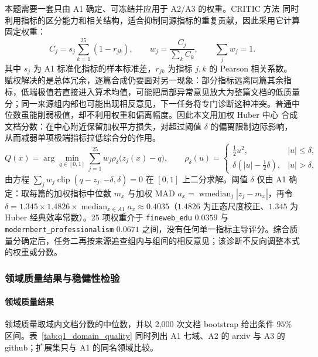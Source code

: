 本题需要一套只由 A1 确定、可冻结并应用于 A2/A3 的权重。CRITIC 方法\cite{critic} 同时利用指标的区分能力和相关结构，适合抑制同源指标的重复贡献，因此采用它计算固定权重：
\begin{equation}
\label{eq:q1_critic}
C_j=s_j\sum_{k=1}^{25}(1-r_{jk}),\qquad w_j=\frac{C_j}{\sum_k C_k},\qquad \sum_j w_j=1 .
\end{equation}
其中 $s_j$ 为 A1 标准化指标的样本标准差，$r_{jk}$ 为指标 $j,k$ 的 Pearson 相关系数。赋权解决的是总体冗余，逐篇合成仍要面对另一现象：部分指标远离同篇其余指标，低端极值若直接进入算术均值，可能把局部异常意见放大为整篇文档的低质量分；同一来源组内部也可能出现相反意见，下一任务将专门诊断这种冲突。普通中位数虽能削弱极值，却不利用权重和偏离幅度。因此本文用加权 Huber 中心\cite{huber} 合成文档分数：在中心附近保留加权平方损失，对超过阈值 $\delta$ 的偏离限制边际影响，从而减弱单项极端指标拉低综合分的作用。
\begin{equation}
\label{eq:q1_huber}
Q(x)=\arg\min_{q\in[0,1]}\sum_{j=1}^{25}w_j\rho_\delta\bigl(z_j(x)-q\bigr),\qquad
\rho_\delta(u)=\begin{cases}\tfrac12u^2,&|u|\le\delta,\\ \delta(|u|-\tfrac12\delta),&|u|>\delta,\end{cases}
\end{equation}
由方程 $\sum_j w_j\operatorname{clip}(q-z_j,-\delta,\delta)=0$ 在 $[0,1]$ 上二分求解。阈值 $\delta$ 仅由 A1 确定：取每篇的加权指标中位数 $m_x$ 与加权 MAD $a_x=\operatorname{wmedian}_j|z_j-m_x|$，再令 $\delta=1.345\times1.4826\times\operatorname{median}_{x\in A1}a_x\approx0.4035$（$1.4826$ 为正态尺度校正、$1.345$ 为 Huber 经典效率常数）。25 项权重介于 \texttt{fineweb\_edu} $0.0359$ 与 \texttt{modernbert\_professionalism} $0.0671$ 之间，没有任何单一指标主导评分。综合质量分确定后，任务二再按来源追查组内与组间的相反意见；该诊断不反向调整本式的权重或分数。

\subsubsection{领域质量结果与稳健性检验}
\label{sec:q1_domain_quality}

\paragraph{领域质量结果}领域质量取域内文档分数的中位数，并以 2,000 次文档 bootstrap 给出条件 $95\%$ 区间。表~\ref{tab:q1_domain_quality} 同时列出 A1 七域、A2 的 arxiv 与 A3 的 github；扩展集只与 A1 的同名领域比较。

